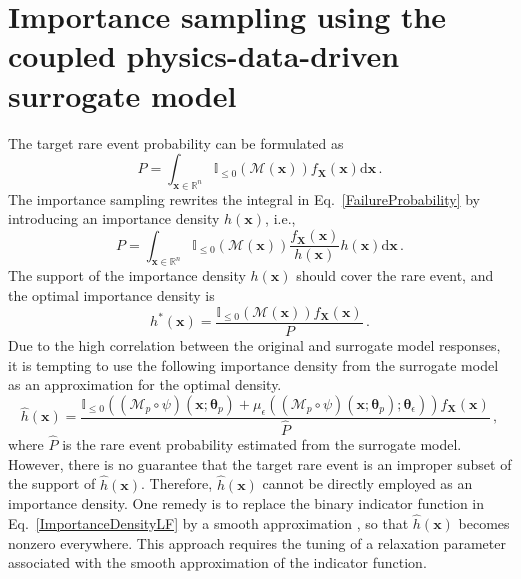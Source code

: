 \documentclass[number,preprint,3p]{elsarticle}
\def\rn{\mathbb{R}^n}
\newcommand{\1}[2]{\mathbb{I}_{#1}\left(#2\right)}
\newcommand{\vect}[1]{\boldsymbol{#1}}
\begin{document}
	\section{Importance sampling using the coupled physics-data-driven surrogate model}\label{Sec:ImportanceSampling}
	\noindent The target rare event probability can be formulated as
	\begin{equation}\label{FailureProbability}
		P=\int _{\vect{x}\in \rn}\1{\leq0}{\mathcal{M}(\vect{x})}f_{\vect{X}}(\vect{x})\mathrm{d}\vect{x}\,.
	\end{equation}
 The importance sampling rewrites the integral in Eq.~\eqref{FailureProbability} by introducing an importance density $h(\vect{x})$, i.e.,
	\begin{equation}\label{ImportanceSampling}
		P=\int _{\vect{x}\in \rn}\1{\leq0}{\mathcal{M}(\vect{x})}\frac{f_{\vect{X}}(\vect{x})}{h(\vect{x})}h(\vect{x})\mathrm{d}\vect{x}\,.
	\end{equation}
	The support of the importance density $h(\vect{x})$ should cover the rare event, and the optimal importance density is \cite{rubinstein1998modern}
	\begin{equation}\label{ImportanceDensityHF}
		h^{\ast }(\vect{x})=\frac{\1{\leq0}{\mathcal{M}(\vect{x})}f_{\vect{X}}(\vect{x})}{P}\,.
	\end{equation}
	Due to the high correlation between the original and surrogate model responses, it is tempting to use the following importance density from the surrogate model as an approximation for the optimal density. 
	\begin{equation}\label{ImportanceDensityLF}
		\hat{h}(\vect{x})=\frac{\1{\leq0}{(\mathcal{M}_{p}\circ\psi)(\vect{x};\vect{\theta}_{p})+\mu_{{\epsilon}}((\mathcal{M}_{p}\circ\psi)(\vect{x};\vect{\theta}_{p});\vect\theta_\epsilon)}f_{\vect{X}}(\vect{x})}{\hat{P}}\,,
	\end{equation}
	where $\hat{P}$ is the rare event probability estimated from the surrogate model. However, there is no guarantee that the target rare event is an improper subset of the support of $\hat h(\vect{x})$. Therefore, $\hat h(\vect{x})$ cannot be directly employed as an importance density. One remedy is to replace the binary indicator function in Eq.~\eqref{ImportanceDensityLF} by a smooth approximation \cite{papaioannou2016sequential,wang2022optimized}, so that $\hat h(\vect{x})$ becomes nonzero everywhere. This approach requires the tuning of a relaxation parameter associated with the smooth approximation of the indicator function. 
    
\end{document}

